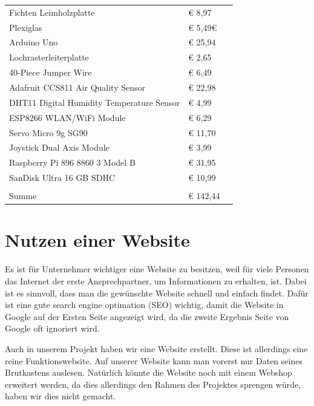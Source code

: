 	\centering
\newline
\caption{Kostenrechnung}
\label{KORE}
\begin{table}[h]
	\begin{tabular}{lll}
		Fichten	Leimholzplatte						 & € 8,97 		                  \\
		Plexiglas                   				 & € 5,49€                        \\
		Arduino Uno							    	 & € 25,94                        \\
		Lochrasterleiterplatte		                 & € 2,65                   	  \\
		40-Piece Jumper Wire 						 & € 6,49						  \\
		Adafruit CCS811 Air Quality Sensor     		 & € 22,98                        \\
		DHT11 Digital Humidity Temperature Sensor    & € 4,99                         \\
		ESP8266 WLAN/WiFi Module		             & € 6,29                         \\
		Servo Micro 9g SG90 						 & € 11,70   					  \\
		Joystick Dual Axis Module                    & € 3,99                  		  \\
		Raspberry Pi 896 8860 3 Model B  			 & € 31,95					      \\
		SanDisk Ultra 16 GB SDHC          			 & € 10,99                        \\
		\\
		Summe										 & € 142,44						  \\
	\end{tabular}
\end{table}

\newpage
\def \currentAuthor {Florian Tipotsch}
\section{Nutzen einer Website}
Es ist für Unternehmer wichtiger eine Website zu besitzen, weil für viele Personen das Internet der erste Ansprechpartner, um Informationen zu erhalten, ist. Dabei ist es sinnvoll, dass man die gewünschte Website schnell und einfach findet. Dafür ist eine gute search engine optimation (SEO) wichtig, damit die Website in Google auf der Ersten Seite angezeigt wird, da die zweite Ergebnis Seite von Google oft ignoriert wird.

Auch in unserem Projekt haben wir eine Website erstellt. Diese ist allerdings eine reine Funktionswebsite. Auf unserer Website kann man vorerst nur Daten seines Brutkastens auslesen. Natürlich könnte die Website noch mit einem Webshop erweitert werden, da dies allerdings den Rahmen des Projektes sprengen würde, haben wir dies nicht gemacht.

